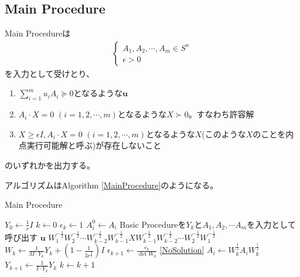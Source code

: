 \subsection{Main Procedure}
Main Procedureは
\begin{align*}
  \left\{
    \begin{array}{l}
      A_1, A_2, \cdots, A_m \in S^n \\
      \epsilon > 0
    \end{array}
  \right.
\end{align*}
を入力として受けとり、
\begin{enumerate}[label=(\alph*)]
  \item $\displaystyle{\sum_{i = 1}^m u_i A_i \succeq 0}$となるような$\mathbf{u}$ \label{DualSolution}
  \item $A_i \cdot X = 0 \,\, (i = 1, 2, \cdots, m)$となるような$X \succ 0$。すなわち許容解 \label{FeasibleSolution}
  \item $X \geq \epsilon I, A_i \cdot X = 0 \,\, (i = 1, 2, \cdots, m)$となるような$X$(このような$X$のことを内点実行可能解と呼ぶ)が存在しないこと \label{NoSolution}
\end{enumerate}
のいずれかを出力する。

アルゴリズムはAlgorithm \ref{MainProcedure}のようになる。
\begin{algorithm}
  \caption{Main Procedure}
  \label{MainProcedure}
  \begin{algorithmic}[1]
    \State $\displaystyle{Y_0 \leftarrow \frac{1}{r} I}$
    \State $k \leftarrow 0$
    \State $\epsilon_k \leftarrow 1$
      \State $A_i^0 \leftarrow A_i$
    \EndFor
    \State Basic Procedureを$Y_k$と$A_1, A_2, \cdots A_m$を入力として呼び出す \label{CallBasicProcedure}
      \State \Return $\mathbf{u}$
      \State \Return $\displaystyle{W_1^{-\frac{1}{2}} W_2^{-\frac{1}{2}} \cdots W_{k - 2}^{-\frac{1}{2}} W_{k - 1}^{-\frac{1}{2}} X W_{k - 1}^{-\frac{1}{2}} W_{k - 2}^{-\frac{1}{2}} \cdots W_2^{-\frac{1}{2}} W_1^{-\frac{1}{2}}}$
    \EndIf
    \State $\displaystyle{W_k \leftarrow \frac{1}{3 I \cdot Y_k} Y_k + (1 - \frac{1}{3 r^\frac{3}{2}}) I}$
    \State $\displaystyle{\epsilon_{k + 1} \leftarrow \frac{\epsilon_k}{\det W_k}}$
      \State \Return \ref{NoSolution}
    \EndIf
      \State $\displaystyle{A_i \leftarrow W_k^\frac{1}{2} A_i W_k^\frac{1}{2}}$
    \EndFor
    \State $\displaystyle{Y_{k + 1} \leftarrow \frac{1}{I \cdot Y_k} Y_k}$
    \State $k \leftarrow k + 1$
    \State {}
  \end{algorithmic}
\end{algorithm}
